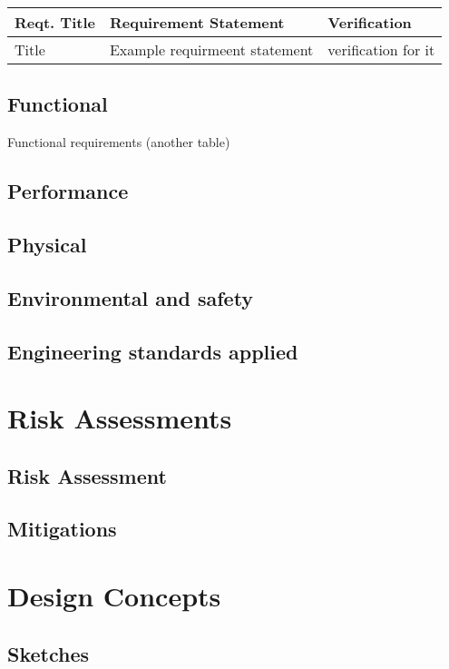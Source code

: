 \documentclass[a4paper,10pt]{article}
\begin{document}
\begin{tabular}{ |p{4cm}|p{6cm}|p{3cm}| }
 \hline
 Reqt. Title & Requirement Statement & Verification \\
 \hline
 \hline
 Title & Example requirmeent statement & verification for it \\
 \hline
\end{tabular}


\subsection{Functional} %

Functional requirements (another table)

\subsection{Performance} %
\subsection{Physical} %
\subsection{Environmental and safety} %
\subsection{Engineering standards applied}
\section{Risk Assessments}
\subsection{Risk Assessment} %
\subsection{Mitigations} %
\section{Design Concepts}
\subsection{Sketches}
\end{document}
